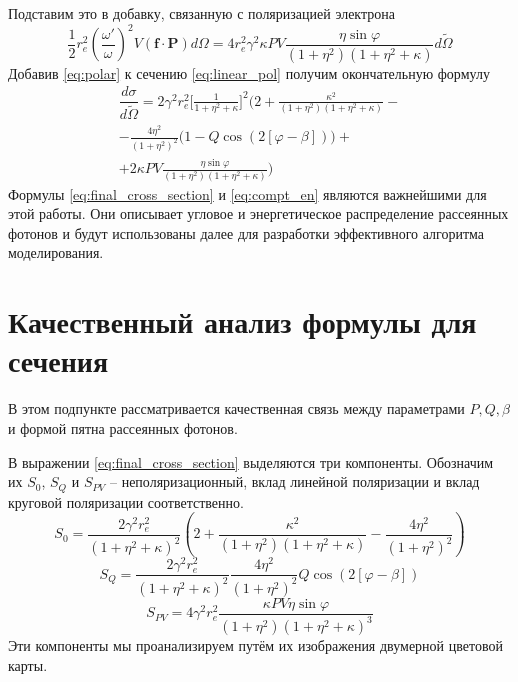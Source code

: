 \documentclass[14pt, a4paper]{extreport}
\begin{document}
Подставим это в добавку, связанную с поляризацией электрона
\begin{equation}
\label{eq:polar}
    \dfrac{1}{2}r_e^2\left( \frac{\omega'}{\omega} \right)^2 V (\bm{f}\cdot\bm{P})d\Omega = 4r_e^2\gamma^2\kappa PV \dfrac{\eta\sin\varphi}{(1+\eta^2)(1+\eta^2+\kappa)}d\widetilde{\Omega}
\end{equation}
Добавив \eqref{eq:polar} к сечению \eqref{eq:linear_pol} получим окончательную формулу
\begin{equation}
\label{eq:final_cross_section}
\begin{aligned}
 \dfrac{d\sigma}{d\widetilde{\Omega}} = 2\gamma^2 r_e^2 
 \bigg[\frac{1}{1+\eta^2+\kappa}\bigg]^2 
 \bigg(
 2 
 + \frac{\kappa^2}{(1+\eta^2)(1+\eta^2+\kappa)} - \\
 -\frac{4\eta^2}{(1+\eta^2)^2}
 \big(1-Q\cos(2[\varphi - \beta])\big)+
 \\
 + 2\kappa P V 
 \frac{\eta \sin \varphi}{(1+\eta^2)(1+\eta^2+ \kappa)}
 \bigg)
\end{aligned}
\end{equation}
Формулы  \eqref{eq:final_cross_section} и \eqref{eq:compt_en} являются важнейшими для этой работы. Они описывает угловое и энергетическое распределение рассеянных фотонов и будут использованы далее для разработки эффективного алгоритма моделирования.
\newpage
\chapter{ Качественный анализ формулы для сечения}
В этом подпункте рассматривается качественная связь между параметрами $P, Q, \beta$ и формой пятна рассеянных фотонов. 

В выражении \eqref{eq:final_cross_section} выделяются три компоненты. Обозначим их $S_0$, $S_Q$ и $S_{PV}$ -- неполяризационный, вклад линейной поляризации и вклад круговой поляризации соответственно.
\begin{equation}
    S_0 = \dfrac{2\gamma^2 r_e^2}{(1+\eta^2+\kappa)^2} 
    \left( 2 + \frac{\kappa^2}{(1+\eta^2)(1+\eta^2+\kappa)} - \frac{4\eta^2}{(1+\eta^2)^2} \right)
\end{equation}
\begin{equation}
    S_Q = \dfrac{2\gamma^2 r_e^2}{(1+\eta^2+\kappa)^2} 
    \frac{4\eta^2}{(1+\eta^2)^2}
 Q\cos(2[\varphi - \beta])
\end{equation}
\begin{equation}
    S_{PV} = 4\gamma^2 r_e^2\dfrac{\kappa P V \eta \sin \varphi}{(1+\eta^2)(1+\eta^2+\kappa)^3} 
\end{equation}
Эти компоненты мы проанализируем путём их изображения двумерной цветовой карты.
\end{document}
